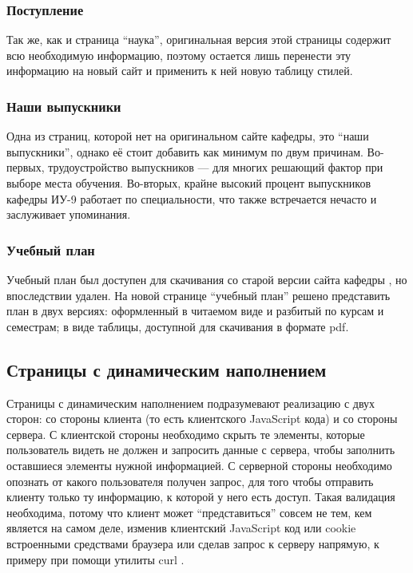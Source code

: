 \documentclass[14pt]{extarticle}
\begin{document}
\subsubsection{Поступление}
Так же, как и страница \enquote{наука}, оригинальная версия этой страницы содержит всю необходимую информацию, поэтому остается лишь перенести эту информацию на новый сайт и применить к ней новую таблицу стилей.

\subsubsection{Наши выпускники}
Одна из страниц, которой нет на оригинальном сайте кафедры, это \enquote{наши выпускники}, однако её стоит добавить как минимум по двум причинам. Во-первых, трудоустройство выпускников --- для многих решающий фактор при выборе места обучения. Во-вторых, крайне высокий процент  выпускников кафедры ИУ-9 работает по специальности, что также встречается нечасто и заслуживает упоминания.

\subsubsection{Учебный план}
Учебный план был доступен для скачивания со старой версии сайта кафедры \cite{iu9-superold}, но впоследствии удален. На новой странице \enquote{учебный план} решено представить план в двух версиях: оформленный в читаемом виде и разбитый по курсам и семестрам; в виде таблицы, доступной для скачивания в формате pdf.

\subsection{Страницы с динамическим наполнением}
Страницы с динамическим наполнением подразумевают реализацию с двух сторон: со стороны клиента (то есть клиентского JavaScript кода) и со стороны сервера. С клиентской стороны необходимо скрыть те элементы, которые пользователь видеть не должен и запросить данные с сервера, чтобы заполнить оставшиеся элементы нужной информацией. С серверной стороны необходимо опознать от какого пользователя получен запрос, для того чтобы отправить клиенту только ту информацию, к которой у него есть доступ. Такая валидация необходима, потому что клиент может \enquote{представиться} совсем не тем, кем является на самом деле, изменив клиентский JavaScript код или cookie \cite{http-cookie} встроенными средствами браузера или сделав запрос к серверу напрямую, к примеру при помощи утилиты curl \cite{curl}.
\end{document}
